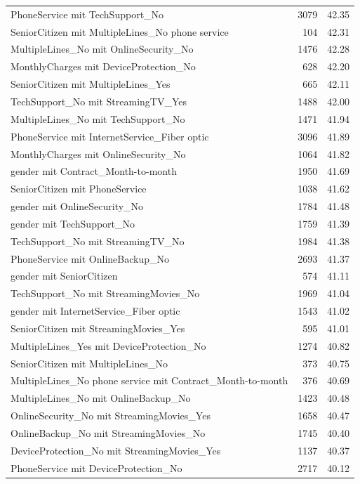 \documentclass[a4paper,11pt]{article}
\begin{document}
\begin{longtable}{p{9cm}rr}
PhoneService mit TechSupport\_No & 3079 & 42.35 \\
SeniorCitizen mit MultipleLines\_No phone service & 104 & 42.31 \\
MultipleLines\_No mit OnlineSecurity\_No & 1476 & 42.28 \\
MonthlyCharges mit DeviceProtection\_No & 628 & 42.20 \\
SeniorCitizen mit MultipleLines\_Yes & 665 & 42.11 \\
TechSupport\_No mit StreamingTV\_Yes & 1488 & 42.00 \\
MultipleLines\_No mit TechSupport\_No & 1471 & 41.94 \\
PhoneService mit InternetService\_Fiber optic & 3096 & 41.89 \\
MonthlyCharges mit OnlineSecurity\_No & 1064 & 41.82 \\
gender mit Contract\_Month-to-month & 1950 & 41.69 \\
SeniorCitizen mit PhoneService & 1038 & 41.62 \\
gender mit OnlineSecurity\_No & 1784 & 41.48 \\
gender mit TechSupport\_No & 1759 & 41.39 \\
TechSupport\_No mit StreamingTV\_No & 1984 & 41.38 \\
PhoneService mit OnlineBackup\_No & 2693 & 41.37 \\
gender mit SeniorCitizen & 574 & 41.11 \\
TechSupport\_No mit StreamingMovies\_No & 1969 & 41.04 \\
gender mit InternetService\_Fiber optic & 1543 & 41.02 \\
SeniorCitizen mit StreamingMovies\_Yes & 595 & 41.01 \\
MultipleLines\_Yes mit DeviceProtection\_No & 1274 & 40.82 \\
SeniorCitizen mit MultipleLines\_No & 373 & 40.75 \\
MultipleLines\_No phone service mit Contract\_Month-to-month & 376 & 40.69 \\
MultipleLines\_No mit OnlineBackup\_No & 1423 & 40.48 \\
OnlineSecurity\_No mit StreamingMovies\_Yes & 1658 & 40.47 \\
OnlineBackup\_No mit StreamingMovies\_No & 1745 & 40.40 \\
DeviceProtection\_No mit StreamingMovies\_Yes & 1137 & 40.37 \\
PhoneService mit DeviceProtection\_No & 2717 & 40.12 \\

\end{longtable}
\end{document}
